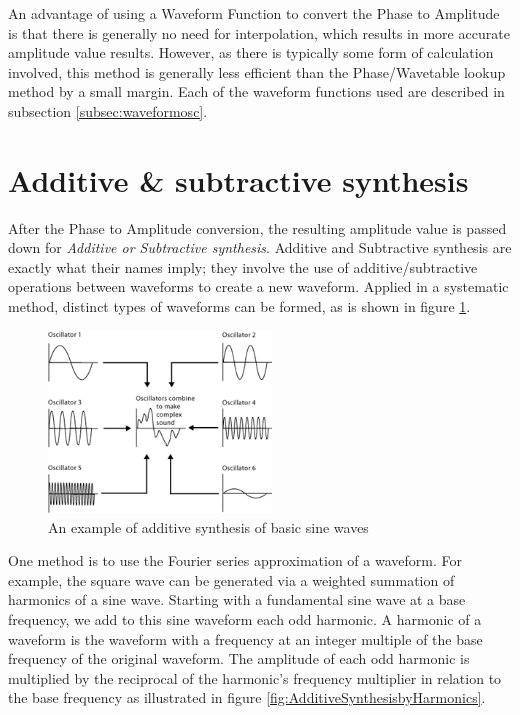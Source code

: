 \documentclass[a4paper,12pt]{report}
\begin{document}
An advantage of using a Waveform Function to convert the Phase to Amplitude is that there is generally no need for interpolation, which results in more accurate amplitude value results. However, as there is typically some form of calculation involved, this method is generally less efficient than the Phase/Wavetable lookup method by a small margin. Each of the waveform functions used are described in subsection \ref{subsec:waveformosc}.

\section{Additive \& subtractive synthesis}
\label{sec:addsubsynthesis}
After the Phase to Amplitude conversion, the resulting amplitude value is passed down for \emph{Additive \-or \-Subtractive \-synthesis}. Additive and Subtractive synthesis are exactly what their names imply; they involve the use of additive/subtractive operations between waveforms to create a new waveform. Applied in a systematic method, distinct types of waveforms can be formed,  as is shown in figure \ref{fig:additivesynthesis}.

\begin{figure}[h]
    \centering
    \includegraphics[width=16em]{AdditiveSynthesis.png}
    \caption{An example of additive synthesis of basic sine waves \cite{planetoftunes}}
    \label{fig:additivesynthesis}
\end{figure}

One method is to use the Fourier series approximation of a waveform. For example, the square wave can be generated via a weighted summation of harmonics of a sine wave. Starting with a fundamental sine wave at a base frequency, we add to this sine waveform each odd harmonic. A harmonic of a waveform is the waveform with a frequency at an integer multiple of the base frequency of the original waveform. The amplitude of each odd harmonic is multiplied by the reciprocal of the harmonic's frequency multiplier in relation to the base frequency as illustrated in figure \ref{fig:AdditiveSynthesisbyHarmonics}.
\end{document}
